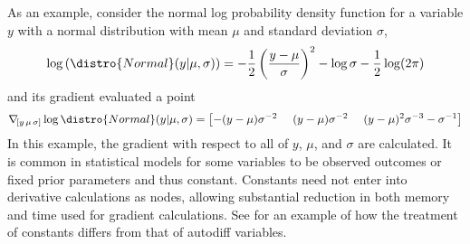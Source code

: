 \documentclass[10pt]{article}
\begin{document}
As an example, consider the normal log probability density function
for a variable $y$ with a normal distribution with mean $\mu$ and
standard deviation $\sigma$,
%
\renewcommand{\theequation}{\arabic{equation}}
\begin{equation}\label{normal-log-density.equation}
\log \left( \distro{Normal}(y|\mu,\sigma) \right)
= -\frac{1}{2} \left( \frac{y - \mu}{\sigma} \right)^2
- \log \sigma
- \frac{1}{2} \log (2 \pi)
\end{equation}
%
and its gradient evaluated a point
%
\begin{equation}\label{gradient-normal-log-density.equation}
  \nabla_{\! [y \, \mu \, \sigma]} \log \distro{Normal}(y|\mu,\sigma) 
  = 
  \left[
    -(y - \mu) \sigma^{-2} \ \ \ \
    (y - \mu) \sigma^{-2} \ \ \ \ 
    (y - \mu)^2 \sigma^{-3} - \sigma^{-1}
  \right]
\end{equation}
%
In this example, the gradient with respect to all of $y$, $\mu$, and
$\sigma$ are calculated.  It is common in statistical models for some
variables to be observed outcomes or fixed prior parameters and thus
constant.  Constants need not enter into derivative calculations as
nodes, allowing substantial reduction in both memory and time used for
gradient calculations.  See \refsection{} for an example of how the
treatment of constants differs from that of autodiff variables.
\end{document}
